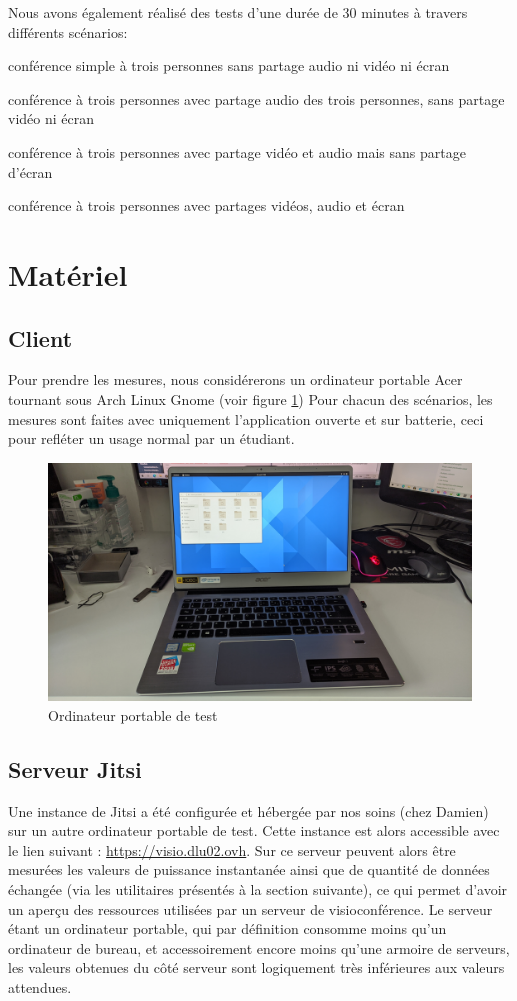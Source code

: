 \documentclass[11pt,a4paper]{report}
\begin{document}
Nous avons également réalisé des tests d'une durée de 30 minutes à travers différents scénarios:
\bi \item conférence simple à trois personnes sans partage audio ni vidéo ni écran 
\item conférence à trois personnes avec partage audio des trois personnes, sans partage vidéo ni écran
\item conférence à trois personnes avec partage vidéo et audio mais sans partage d'écran
\item conférence à trois personnes avec partages vidéos, audio et écran \ei 

\section{Matériel}
\subsection{Client}
Pour prendre les mesures, nous considérerons un ordinateur portable Acer tournant sous Arch Linux Gnome (voir figure \ref{fig:test}) Pour chacun des scénarios, les mesures sont faites avec uniquement l'application ouverte et sur batterie, ceci pour refléter un usage normal par un étudiant.
\begin{figure}[!h]
    \centering
    \includegraphics[scale=0.1]{ordinateur.jpg}
    \caption{Ordinateur portable de test}
     \label{fig:test}
\end{figure}
\subsection{Serveur Jitsi}
Une instance de Jitsi a été configurée et hébergée par nos soins (chez Damien) sur un autre ordinateur portable de test. Cette instance est alors accessible avec le lien suivant : \url{https://visio.dlu02.ovh}. Sur ce serveur peuvent alors être mesurées les valeurs de puissance instantanée ainsi que de quantité de données échangée (via les utilitaires présentés à la section suivante), ce qui permet d'avoir un aperçu des ressources utilisées par un serveur de visioconférence. 
\br Le serveur étant un ordinateur portable, qui par définition consomme moins qu'un ordinateur de bureau, et accessoirement encore moins qu'une armoire de serveurs, les valeurs obtenues du côté serveur sont logiquement très inférieures aux valeurs attendues. \eb
\end{document}
